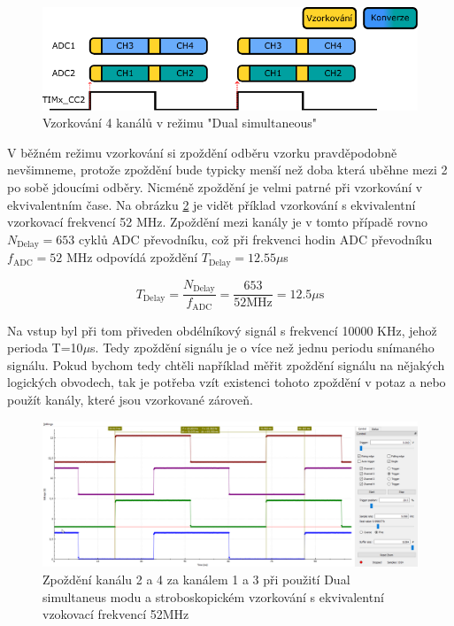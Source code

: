 \begin{figure}[H]
	\centering
	\includegraphics[width=0.9\linewidth]{Figs/Diagrams/SVG/DualSimul.pdf}
	\caption{Vzorkování 4 kanálů v režimu "Dual simultaneous"}
	\label{fig:dualsimul2adc}
\end{figure}

V běžném režimu vzorkování si zpoždění odběru vzorku pravděpodobně nevšimneme, protože zpoždění bude typicky menší než doba která uběhne mezi 2 po sobě jdoucími odběry. Nicméně zpoždění je velmi patrné při vzorkování v ekvivalentním čase. Na obrázku \ref{fig:dualsimul4chn} je vidět příklad vzorkování s ekvivalentní vzorkovací frekvencí 52 MHz. Zpoždění mezi kanály je v tomto případě rovno $N_{\text{Delay}}=653$ cyklů ADC převodníku, což při frekvenci hodin ADC převodníku $f_{\text{ADC}}=52$ MHz odpovídá zpoždění $T_{\text{Delay}}=12.55\mu$s

\begin{equation}
	T_{\text{Delay}}=\frac{N_{\text{Delay}}}{f_{\text{ADC}}}=\frac{653}{52 \text{MHz}}=12.5\mu\text{s}
\end{equation}

Na vstup byl při tom přiveden obdélníkový signál s frekvencí 10000 KHz, jehož perioda T=10$\mu$s. Tedy zpoždění signálu je o více než jednu periodu snímaného signálu. Pokud bychom tedy chtěli například měřit zpoždění signálu na nějakých logických obvodech, tak je potřeba vzít existenci tohoto zpoždění v potaz a nebo použít kanály, které jsou vzorkované zároveň.


\begin{figure}[H]
	\centering
	\includegraphics[width=1\linewidth]{Figs/Screenshots/DualSimul4Chn}
	\caption{Zpoždění kanálu 2 a 4 za kanálem 1 a 3 při použití Dual simultaneus modu a stroboskopickém vzorkování s ekvivalentní vzokovací frekvencí 52MHz}
	\label{fig:dualsimul4chn}
\end{figure}

